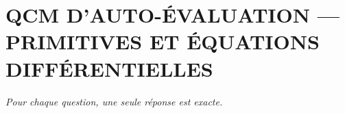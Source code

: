 
\section*{\textcolor{chapcolor}{\MakeUppercase{QCM d'auto-évaluation — Primitives et équations différentielles}}}

\begin{center}
\textit{Pour chaque question, une seule réponse est exacte.}
\end{center}


